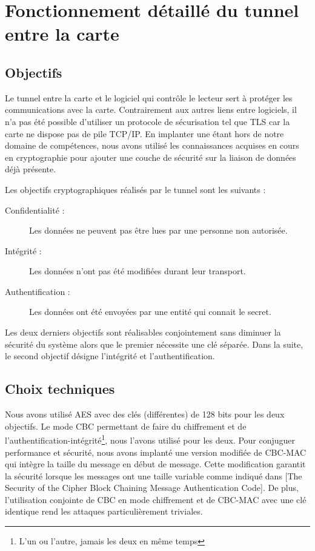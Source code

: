 \documentclass[a4paper,11pt,french]{article}
\begin{document}
\clearpage

\appendix

\section{Fonctionnement détaillé du tunnel entre la carte}
\label{TunnelSS}


\subsection{Objectifs}
Le tunnel entre la carte et le logiciel qui contr\^ole le lecteur sert à 
protéger les communications avec la carte. Contrairement aux autres liens entre 
logiciels, il n'a pas été possible d'utiliser un protocole de sécurisation tel 
que TLS car la carte ne dispose pas de pile TCP/IP. En implanter une étant hors
de notre domaine de compétences, nous avons utilisé les connaissances acquises 
en cours en cryptographie pour ajouter une couche de sécurité sur la liaison de 
données déjà présente. 

Les objectifs cryptographiques réalisés par le tunnel sont les suivants : 
\begin{description}
    \item[Confidentialité :] Les données ne peuvent pas être lues par une 
        personne non autorisée.
    \item[Intégrité :] Les données n'ont pas été modifiées durant leur 
        transport.
    \item[Authentification :] Les données ont été envoyées par une entité qui 
        connait le secret.
\end{description}
Les deux derniers objectifs sont réalisables conjointement sans diminuer la 
sécurité du système alors que le premier nécessite une clé séparée. Dans la 
suite, le second objectif désigne l'intégrité et l'authentification. 


\subsection{Choix techniques}
Nous avons utilisé AES avec des clés (différentes) de 128 bits pour les deux 
objectifs. Le mode CBC permettant de faire du chiffrement et de 
l'authentification-intégrité\footnote{L'un ou l'autre, jamais les deux en même 
temps}, nous l'avons utilisé pour les deux. Pour conjuguer performance et 
sécurité, nous avons implanté une version modifiée de CBC-MAC qui intègre la 
taille du message en début de message. Cette modification garantit la sécurité 
lorsque les messages ont une taille variable comme indiqué dans [The Security of
the Cipher Block Chaining Message Authentication Code]. De plus, l'utilisation 
conjointe de CBC en mode chiffrement et de CBC-MAC avec une clé identique rend les 
attaques particulièrement triviales.
\end{document}
